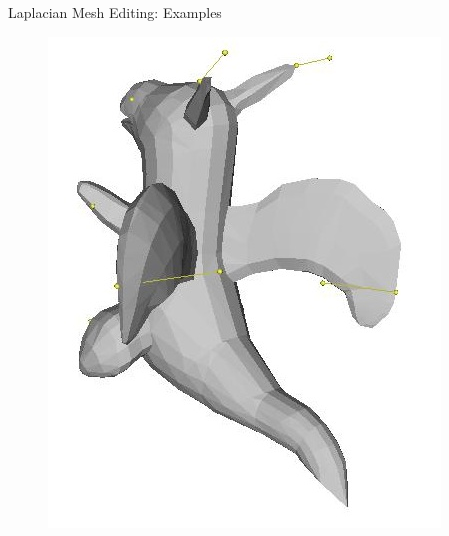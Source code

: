 \documentclass{beamer}
\begin{document}
\begin{frame}{Laplacian Mesh Editing: Examples}



\begin{figure}
\begin{minipage}{0.45\textwidth}
    \includegraphics[width=\textwidth]{deform5_1.jpg}
\end{minipage}
\end{figure}
\end{frame}
\end{document}

